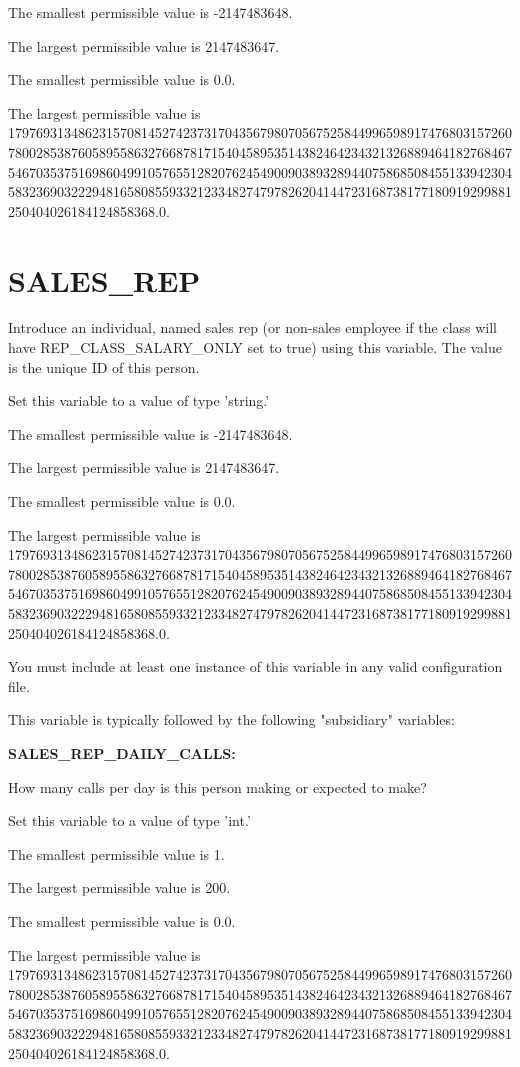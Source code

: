 The smallest permissible value is -2147483648.

The largest permissible value is 2147483647.

The smallest permissible value is 0.0.

The largest permissible value is 179769313486231570814527423731704356798070567525844996598917476803157260780028538760589558632766878171540458953514382464234321326889464182768467546703537516986049910576551282076245490090389328944075868508455133942304583236903222948165808559332123348274797826204144723168738177180919299881250404026184124858368.0.


\section{SALES\_REP}


Introduce an individual, named sales rep (or non-sales employee if the class will have REP\_CLASS\_SALARY\_ONLY set to true) using this variable.  The value is the unique ID of this person.

Set this variable to a value of type 'string.'

The smallest permissible value is -2147483648.

The largest permissible value is 2147483647.

The smallest permissible value is 0.0.

The largest permissible value is 179769313486231570814527423731704356798070567525844996598917476803157260780028538760589558632766878171540458953514382464234321326889464182768467546703537516986049910576551282076245490090389328944075868508455133942304583236903222948165808559332123348274797826204144723168738177180919299881250404026184124858368.0.

You must include at least one instance of this variable in any valid configuration file.

This variable is typically followed by the following "subsidiary" variables:


\textbf{SALES\_REP\_DAILY\_CALLS:}


How many calls per day is this person making or expected to make?

Set this variable to a value of type 'int.'

The smallest permissible value is 1.

The largest permissible value is 200.

The smallest permissible value is 0.0.

The largest permissible value is 179769313486231570814527423731704356798070567525844996598917476803157260780028538760589558632766878171540458953514382464234321326889464182768467546703537516986049910576551282076245490090389328944075868508455133942304583236903222948165808559332123348274797826204144723168738177180919299881250404026184124858368.0.


